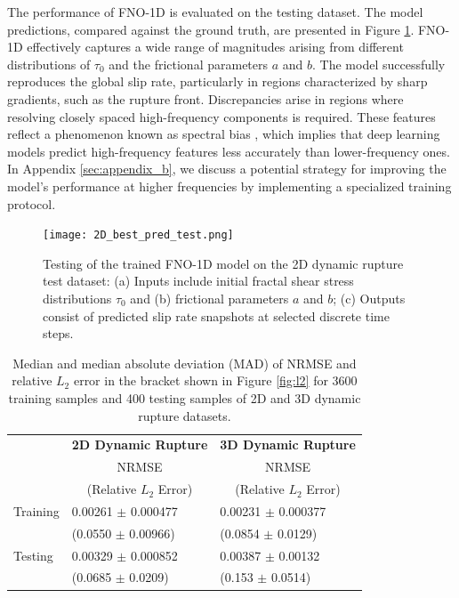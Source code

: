 \documentclass[draft]{agujournal2019}
\begin{document}
The performance of FNO-1D is evaluated on the testing dataset. The model predictions, compared against the ground truth, are presented in Figure \ref{fig:fno_1D_test}. FNO-1D effectively captures a wide range of magnitudes arising from different distributions of \(\tau_{0}\) and the frictional parameters \(a\) and \(b\). The model successfully reproduces the global slip rate, particularly in regions characterized by sharp gradients, such as the rupture front. Discrepancies arise in regions where resolving closely spaced high-frequency components is required. These features reflect a phenomenon known as spectral bias \cite{rahaman2019spectral, cao2019towards, kong2025reducing}, which implies that deep learning models predict high-frequency features less accurately than lower-frequency ones. In Appendix \ref{sec:appendix_b}, we discuss a potential strategy for improving the model's performance at higher frequencies by implementing a specialized training protocol.


\begin{figure}
\centering
\texttt{[image: 2D\_best\_pred\_test.png]}
\caption{\label{fig:fno_1D_test}Testing of the trained FNO-1D model on the 2D dynamic rupture test dataset: (a) Inputs include initial fractal shear stress distributions \(\tau_{0}\) and (b) frictional parameters \(a\) and \(b\); (c) Outputs consist of predicted slip rate snapshots at selected discrete time steps.
}
\end{figure}

\begin{table}
\caption{Median and median absolute deviation (MAD) of NRMSE and relative \(L_2\) error in the bracket shown in Figure \ref{fig:l2} for 3600 training samples and 400 testing samples of 2D and 3D dynamic rupture datasets.}
    \centering
    { %
    \begin{tabular}{lll}
        \toprule
        \multirow{3}{*}{} & \multicolumn{1}{c}{\textbf{2D Dynamic Rupture}} & \multicolumn{1}{c}{\textbf{3D Dynamic Rupture}} \\
        & \multicolumn{1}{c}{NRMSE} & \multicolumn{1}{c}{NRMSE} \\
        & \multicolumn{1}{c}{(Relative \( L_2 \) Error)} & \multicolumn{1}{c}{(Relative \( L_2 \) Error)} \\
        \midrule
        Training& 0.00261 $\pm$  0.000477 & 0.00231 $\pm$  0.000377 \\
         & (0.0550 $\pm$  0.00966) & (0.0854 $\pm$ 0.0129) \\
        Testing & 0.00329 $\pm$  0.000852 &  0.00387 $\pm$  0.00132\\
         & (0.0685 $\pm$ 0.0209)  & (0.153 $\pm$ 0.0514) \\
        \bottomrule
    \end{tabular}
    }
    \label{tab:relative_l2_error}
\end{table}
\end{document}
